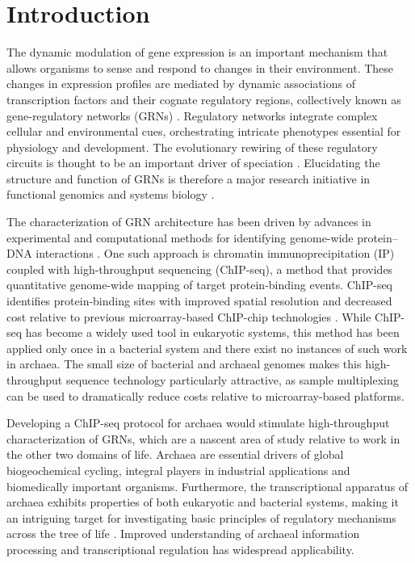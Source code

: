 \section{Introduction}

The dynamic modulation of gene expression is an important mechanism that allows organisms to sense and respond to changes in their environment. These changes in expression profiles are mediated by dynamic associations of transcription factors and their cognate regulatory regions, collectively known as gene-regulatory networks (GRNs) \cite{davidson2001}. Regulatory networks integrate complex cellular and environmental cues, orchestrating intricate phenotypes essential for physiology and development. The evolutionary rewiring of these regulatory circuits is thought to be an important driver of speciation \cite{shou2011measuring}. Elucidating the structure and function of GRNs is therefore a major research initiative in functional genomics and systems biology \cite{harbison_transcriptional_2004, peter_modularity_2009, kaleta_integrative_2010, palaniswamy_agris_2006, fadda_inferring_2009, bonneau_predictive_2007}.

The characterization of GRN architecture has been driven by advances in experimental and computational methods for identifying genome-wide protein–DNA interactions \cite{hesselberth_global_2009, park_chip-seq:_2009, wilbanks2010evaluation, bonneau_inferelator:_2006, de_jong_modeling_2002}. One such approach is chromatin immunoprecipitation (IP) coupled with high-throughput sequencing (ChIP-seq), a method that provides quantitative genome-wide mapping of target protein-binding events. ChIP-seq identifies protein-binding sites with improved spatial resolution and decreased cost relative to previous microarray-based ChIP-chip technologies \cite{park_chip-seq:_2009}. While ChIP-seq has become a widely used tool in eukaryotic systems, this method has been applied only once in a bacterial system \cite{lun_blind_2009} and there exist no instances of such work in archaea. The small size of bacterial and archaeal genomes makes this high-throughput sequence technology particularly attractive, as sample multiplexing can be used to dramatically reduce costs relative to microarray-based platforms.

Developing a ChIP-seq protocol for archaea would stimulate high-throughput characterization of GRNs, which are a nascent area of study relative to work in the other two domains of life. Archaea are essential drivers of global biogeochemical cycling, integral players in industrial applications and biomedically important organisms. Furthermore, the transcriptional apparatus of archaea exhibits properties of both eukaryotic and bacterial systems, making it an intriguing target for investigating basic principles of regulatory mechanisms across the tree of life \cite{bell_archaeal_2005}. Improved understanding of archaeal information processing and transcriptional regulation has widespread applicability.

